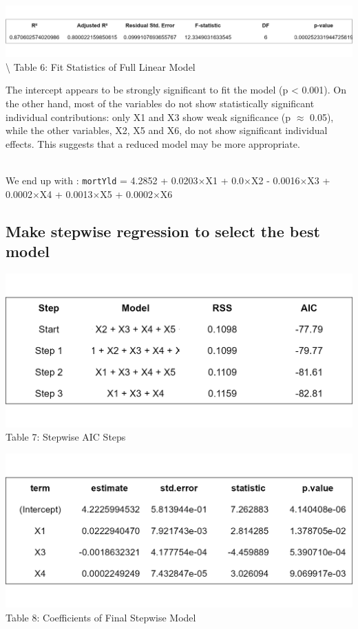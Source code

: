 \documentclass[
  11pt,
]{article}
\begin{document}
\noindent
\includegraphics[width=0.9\linewidth,height=0.18\textheight]{full_model_fitstats_table.png}\textbackslash{}
\small Table 6: Fit Statistics of Full Linear Model

\addtocounter{table}{2}

The intercept appears to be strongly significant to fit the model (p
\textless{} 0.001). On the other hand, most of the variables do not show
statistically significant individual contributions: only X1 and X3 show
weak significance (p \(\approx\) 0.05), while the other variables, X2,
X5 and X6, do not show significant individual effects. This suggests
that a reduced model may be more appropriate.\\
\strut \\
We end up with : \texttt{mortYld} = 4.2852 + 0.0203\(\times\)X1 +
0.0\(\times\)X2 - 0.0016\(\times\)X3 + 0.0002\(\times\)X4 +
0.0013\(\times\)X5 + 0.0002\(\times\)X6

\subsection{Make stepwise regression to select the best
model}\label{make-stepwise-regression-to-select-the-best-model}

\begin{minipage}{0.48\textwidth}
\centering
\includegraphics[width=\linewidth]{stepwise_aic_table.png}\\
\small Table 7: Stepwise AIC Steps
\end{minipage}
\hfill
\begin{minipage}{0.48\textwidth}
\centering
\includegraphics[width=\linewidth]{stepwise_coef_table.png}\\
\small Table 8: Coefficients of Final Stepwise Model
\end{minipage}
\end{document}
